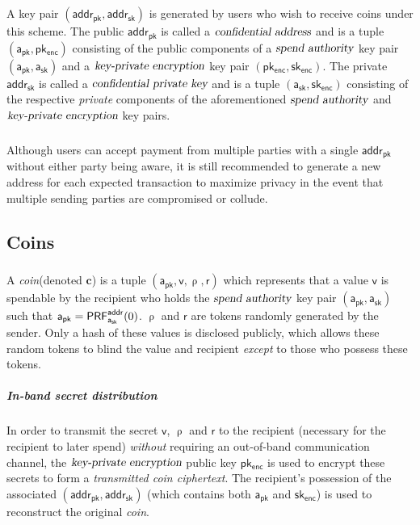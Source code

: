 \documentclass[8pt]{article}
\newcommand{\term}[1]{\textsl{#1}\xspace}
\newcommand{\coin}{\term{coin}}
\newcommand{\publicAddress}{\term{confidential address}}
\newcommand{\privateAddress}{\term{confidential private key}}
\newcommand{\transmittedCiphertext}{\term{transmitted coin ciphertext}}
\newcommand{\transmitPublicAlgorithm}{\term{key-private encryption}}
\newcommand{\spendAuthority}{\term{spend authority}}
\newcommand{\PublicAddress}{\mathsf{addr_{pk}}}
\newcommand{\PrivateAddress}{\mathsf{addr_{sk}}}
\newcommand{\SpendAuthorityPublic}{\mathsf{a_{pk}}}
\newcommand{\SpendAuthorityPrivate}{\mathsf{a_{sk}}}
\newcommand{\TransmitPublic}{\mathsf{pk_{enc}}}
\newcommand{\TransmitPrivate}{\mathsf{sk_{enc}}}
\newcommand{\Value}{\mathsf{v}}
\newcommand{\Coin}{\mathbf{c}}
\newcommand{\CoinCommitRand}{\mathsf{r}}
\newcommand{\CoinAddressRand}{\mathsf{\uprho}}
\newcommand{\PRF}[2]{\mathsf{{PRF}^{#2}_\mathnormal{#1}}}
\newcommand{\PRFaddr}[1]{\PRF{#1}{addr}}
\begin{document}
\subparagraph{}

A key pair $(\PublicAddress, \PrivateAddress)$ is generated by users who wish to
receive coins under this scheme. The public $\PublicAddress$ is called a
$\publicAddress$ and is a tuple $(\SpendAuthorityPublic, \TransmitPublic)$
consisting of the public components of a $\spendAuthority$ key pair
$(\SpendAuthorityPublic, \SpendAuthorityPrivate)$ and a $\transmitPublicAlgorithm$ key
pair $(\TransmitPublic, \TransmitPrivate)$. The private $\PrivateAddress$ is called
a $\privateAddress$ and is a tuple $(\SpendAuthorityPrivate, \TransmitPrivate)$
consisting of the respective \emph{private} components of the aforementioned
$\spendAuthority$ and $\transmitPublicAlgorithm$ key pairs.

\subparagraph{}

Although users can accept payment from multiple parties with a single
$\PublicAddress$ without either party being aware, it is still recommended to
generate a new address for each expected transaction to maximize privacy in the
event that multiple sending parties are compromised or collude.

\subsection{Coins}

\subparagraph{}

A \coin (denoted $\Coin$) is a tuple $(\SpendAuthorityPublic, \Value,
\CoinAddressRand, \CoinCommitRand)$ which represents that a value $\Value$ is
spendable by the recipient who holds the $\spendAuthority$ key pair
$(\SpendAuthorityPublic, \SpendAuthorityPrivate)$ such that
$\SpendAuthorityPublic = \PRFaddr{\SpendAuthorityPrivate}(0)$. $\CoinAddressRand$ and
$\CoinCommitRand$ are tokens randomly generated by the sender. Only a hash of
these values is disclosed publicly, which allows these random tokens to blind the
value and recipient \emph{except} to those who possess these tokens.

\subparagraph{In-band secret distribution}

In order to transmit the secret $\Value$, $\CoinAddressRand$ and $\CoinCommitRand$ 
to the recipient (necessary for the recipient to later spend) \emph{without} 
requiring an out-of-band communication channel, the $\transmitPublicAlgorithm$ 
public key $\TransmitPublic$ is used to encrypt these secrets to form a 
\transmittedCiphertext. The recipient's possession of the associated 
$(\PublicAddress, \PrivateAddress)$ (which contains both $\SpendAuthorityPublic$ and 
$\TransmitPrivate$) is used to reconstruct the original \coin.
\end{document}
